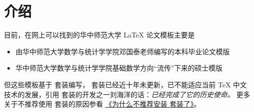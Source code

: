 \documentclass{ccnudoc}
\begin{document}
\thispagestyle{plain}
\clearpage




\tableofcontents



\section{介绍}

目前，在网上可以找到的华中师范大学 \LaTeX{} 论文模板主要是

\begin{itemize}
  \item 由华中师范大学数学与统计学学院邓国泰老师编写的本科毕业论文模版
  \item 华中师范大学数学与统计学学院基础数学方向“流传”下来的硕士模版
\end{itemize}

但这些模板基于 \CTeX 套装编写， \CTeX 套装已经近十年未更新，已不能适应当前 \TeX{} 中文技术的发展，引用 \CTeX 套装的开发之一刘海洋的话：\emph{\CTeX 已经完成了它的历史使命。} 更多关于不推荐使用 \CTeX 套装的原因参看 \href{https://gitee.com/xkwxdyy/CCNUthesis/wikis/%E5%B8%B8%E8%A7%81%E9%97%AE%E9%A2%98FAQ/%E4%B8%BA%E4%BB%80%E4%B9%88%E4%B8%8D%E6%8E%A8%E8%8D%90%E5%AE%89%E8%A3%85\CTeX%E5%A5%97%E8%A3%85%E4%BA%86}{《为什么不推荐安装 \CTeX 套装了》}。
\end{document}
